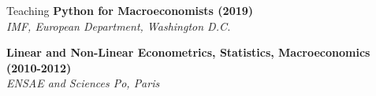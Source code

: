 \documentclass[usegeometry, 10pt, a4paper]{cv} %
\newcommand{\activite}[1]{\textbf{#1}\ }
\begin{document}
\begin{rubriquetableau}[0.95\textwidth]{Teaching}
\small
\activite{Python for Macroeconomists (2019)} \\
\hspace{0.6cm} \small{\emph{IMF, European Department, Washington D.C.}}
\vspace{0.3cm} 

\small
\activite{Linear and Non-Linear Econometrics, Statistics, Macroeconomics (2010-2012)} \\
\hspace{0.6cm} \small{\emph{ENSAE and Sciences Po, Paris}}
\vspace{0.3cm} 
\end{rubriquetableau}

\newpage

\end{document}
